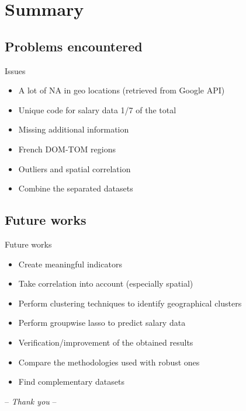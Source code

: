 \documentclass[12pt]{beamer}
\begin{document}
\section{Summary}


\subsection{Problems encountered}


\begin{frame}{\textcolor{bscuro}{Issues}}
	\begin{itemize}
		\item A lot of NA in geo locations (retrieved from Google API)
		\item Unique code for salary data 1/7 of the total 
		\item Missing additional information 
		\item French DOM-TOM regions
		\item Outliers and spatial correlation
		\item Combine the separated datasets
	\end{itemize}
\end{frame}			


\subsection{Future works}


\begin{frame}{\textcolor{bscuro}{Future works}}
	\begin{itemize}
		\item Create meaningful indicators
		\item Take correlation into account (especially spatial)
		\item Perform clustering techniques to identify geographical clusters
		\item Perform groupwise lasso to predict salary data
		\item Verification/improvement of the obtained results 
		\item Compare the methodologies used with robust ones
		\item Find complementary datasets
	\end{itemize}	
\end{frame}		


\begin{frame}
	\centerline{\Huge\textcolor{bscuro}{ -- \emph{Thank you} -- }}
\end{frame}
\end{document}
